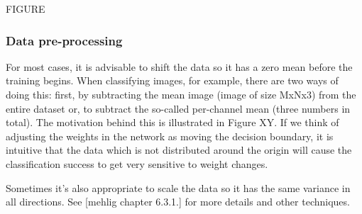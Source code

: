FIGURE

\subsubsection{Data pre-processing}

For most cases, it is advisable to shift the data so it has a zero mean before the training begins. When classifying images, for example, there are two ways of doing this: first, by subtracting the mean image (image of size MxNx3) from the entire dataset or, to subtract the so-called per-channel mean (three numbers in total). The motivation behind this is illustrated in Figure XY. If we think of adjusting the weights in the network as moving the decision boundary, it is intuitive that the data which is not distributed around the origin will cause the classification success to get very sensitive to weight changes.

Sometimes it's also appropriate to scale the data so it has the same variance in all directions. See [mehlig chapter 6.3.1.] for more details and other techniques.






